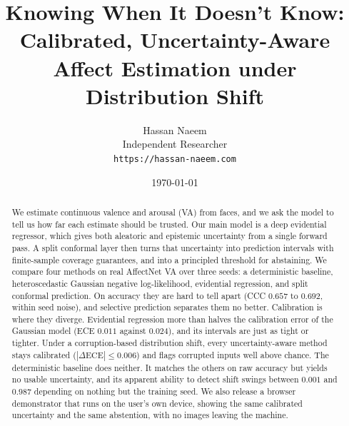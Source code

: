 \documentclass[11pt]{article}
\title{Knowing When It Doesn't Know:\\
       Calibrated, Uncertainty-Aware Affect Estimation under Distribution Shift}
\author{Hassan Naeem\\
        \normalsize Independent Researcher\\
        \normalsize \texttt{https://hassan-naeem.com}}
\date{\today}
\begin{document}
\maketitle

\begin{abstract}
We estimate continuous valence and arousal (VA) from faces, and we ask the model
to tell us how far each estimate should be trusted. Our main model is a deep
evidential regressor, which gives both aleatoric and epistemic uncertainty from a
single forward pass. A split conformal layer then turns that uncertainty into
prediction intervals with finite-sample coverage guarantees, and into a
principled threshold for abstaining. We compare four methods on real AffectNet VA
over three seeds: a deterministic baseline, heteroscedastic Gaussian negative
log-likelihood, evidential regression, and split conformal prediction. On
accuracy they are hard to tell apart (CCC $0.657$ to $0.692$, within seed noise),
and selective prediction separates them no better. Calibration is where they
diverge. Evidential regression more than halves the calibration error of the
Gaussian model (ECE $0.011$ against $0.024$), and its intervals are just as tight
or tighter. Under a corruption-based distribution shift, every uncertainty-aware
method stays calibrated ($|\Delta\text{ECE}| \le 0.006$) and flags corrupted
inputs well above chance. The deterministic baseline does neither. It matches the
others on raw accuracy but yields no usable uncertainty, and its apparent ability
to detect shift swings between $0.001$ and $0.987$ depending on nothing but the
training seed. We also release a browser demonstrator that runs on the user's own
device, showing the same calibrated uncertainty and the same abstention, with no
images leaving the machine.
\end{abstract}











\end{document}

